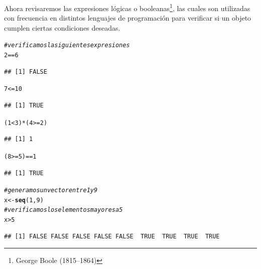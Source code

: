 \documentclass[11pt,a4paper,oneside]{book}\usepackage[]{graphicx}\usepackage[]{color}
\makeatletter
\newcommand{\hlnum}[1]{\textcolor[rgb]{0.686,0.059,0.569}{#1}}%
\newcommand{\hlcom}[1]{\textcolor[rgb]{0.678,0.584,0.686}{\textit{#1}}}%
\newcommand{\hlopt}[1]{\textcolor[rgb]{0,0,0}{#1}}%
\newcommand{\hlstd}[1]{\textcolor[rgb]{0.345,0.345,0.345}{#1}}%
\newcommand{\hlkwb}[1]{\textcolor[rgb]{0.69,0.353,0.396}{#1}}%
\newcommand{\hlkwd}[1]{\textcolor[rgb]{0.737,0.353,0.396}{\textbf{#1}}}%
\newenvironment{kframe}{%
 \def\at@end@of@kframe{}%
 \ifinner\ifhmode%
  \def\at@end@of@kframe{\end{minipage}}%
  \begin{minipage}{\columnwidth}%
 \fi\fi%
 \def\FrameCommand##1{\hskip\@totalleftmargin \hskip-\fboxsep
 \colorbox{shadecolor}{##1}\hskip-\fboxsep
     \hskip-\linewidth \hskip-\@totalleftmargin \hskip\columnwidth}%
 \MakeFramed {\advance\hsize-\width
   \@totalleftmargin\z@ \linewidth\hsize
   \@setminipage}}%
 {\par\unskip\endMakeFramed%
 \at@end@of@kframe}
\newenvironment{knitrout}{}{} %
\makeatother
\begin{document}
\begin{itemize}
Ahora revisaremos las expresiones lógicas o booleanas\footnote{George Boole (1815–1864)}, las cuales son utilizadas con frecuencia en distintos lenguajes de programación para verificar si un objeto cumplen ciertas condiciones deseadas.
\begin{knitrout}
\color{fgcolor}\begin{kframe}
\begin{alltt}
\hlcom{# verificamos la siguientes expresiones}
\hlnum{2} \hlopt{==} \hlnum{6}
\end{alltt}
\begin{verbatim}
## [1] FALSE
\end{verbatim}
\begin{alltt}
\hlnum{7} \hlopt{<=} \hlnum{10}
\end{alltt}
\begin{verbatim}
## [1] TRUE
\end{verbatim}
\begin{alltt}
\hlstd{(}\hlnum{1} \hlopt{<} \hlnum{3}\hlstd{)} \hlopt{*} \hlstd{(}\hlnum{4} \hlopt{>=} \hlnum{2}\hlstd{)}
\end{alltt}
\begin{verbatim}
## [1] 1
\end{verbatim}
\begin{alltt}
\hlstd{(}\hlnum{8} \hlopt{>=} \hlnum{5}\hlstd{)} \hlopt{==} \hlnum{1}
\end{alltt}
\begin{verbatim}
## [1] TRUE
\end{verbatim}
\begin{alltt}
\hlcom{# generamos un vector entre 1 y 9}
\hlstd{x} \hlkwb{<-} \hlkwd{seq}\hlstd{(}\hlnum{1}\hlstd{,}\hlnum{9}\hlstd{)}
\hlcom{# verificamos los elementos mayores a 5}
\hlstd{x} \hlopt{>} \hlnum{5}
\end{alltt}
\begin{verbatim}
## [1] FALSE FALSE FALSE FALSE FALSE  TRUE  TRUE  TRUE  TRUE
\end{verbatim}
\end{kframe}
\end{knitrout}


\end{itemize}
\end{document}
